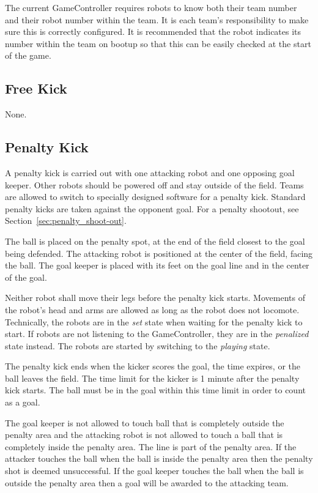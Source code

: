 \documentclass[12pt]{article}
\begin{document}
The current GameController requires robots to know both their team number and their robot number within the team. It is each team's responsibility to make sure this is correctly configured. It is recommended that the robot indicates its number within the team on bootup so that this can be easily checked at the start of the game.

\subsection{Free Kick}

None.

\subsection{Penalty Kick}
\label{sec:penalty_kick}

A penalty kick is carried out with one attacking robot and one opposing goal keeper. Other robots should be powered off and stay outside of the field. Teams are allowed to switch to specially designed software for a penalty kick. Standard penalty kicks are taken against the opponent goal. For a penalty shootout, see Section~\ref{sec:penalty_shoot-out}.

The ball is placed on the penalty spot, at the end of the field closest to the goal being defended. The attacking robot is positioned at the center of the field, facing the ball. The goal keeper is placed with its feet on the goal line and in the center of the goal.

Neither robot shall move their legs before the penalty kick starts. Movements of the robot's head and arms are allowed as long as the robot does not locomote. Technically, the robots are in the \emph{set} state when waiting for the penalty kick to start. If robots are not listening to the GameController, they are in the \emph{penalized} state instead. The robots are started by switching to the \emph{playing} state.

The penalty kick ends when the kicker scores the goal, the time expires, or the ball leaves the field. The time limit for the kicker is 1 minute after the penalty kick starts. The ball must be in the goal within this time limit in order to count as a goal.

The goal keeper is not allowed to touch ball that is completely outside the penalty area and the attacking robot is not allowed to touch a ball that is completely inside the penalty area. The line is part of the penalty area. If the attacker touches the ball when the ball is inside the penalty area then the penalty shot is deemed unsuccessful. If the goal keeper touches the ball when the ball is outside the penalty area then a goal will be awarded to the attacking team.
\end{document}
